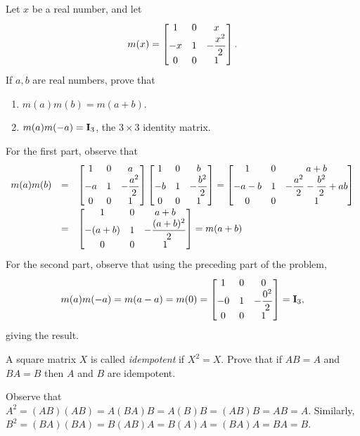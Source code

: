 \begin{exa}
Let $x$ be a real number, and let  $$m(x) = \begin{bmatrix}1 & 0 &
x\cr -x & 1 & -\dfrac{x^2}{2} \cr 0 &0 &1\cr \end{bmatrix}.  $$If
$a, b$ are real numbers, prove that
\begin{enumerate}
\item $m(a)m(b)=m(a+b)$.
\item $m(a)m(-a)={\bf I}_3$, the $3\times 3$ identity matrix.
\end{enumerate}
\begin{sol}
For the first part, observe that $$\begin{array}{llll}m(a)m(b) & = &
\begin{bmatrix}1 & 0 & a\cr -a & 1 & -\dfrac{a^2}{2} \cr 0 &0 &1\cr
\end{bmatrix}\begin{bmatrix}1 & 0 & b\cr
-b & 1 & -\dfrac{b^2}{2} \cr 0 &0 &1\cr \end{bmatrix} 
 = \begin{bmatrix}1 & 0 & a+b\cr -a-b & 1 &
-\dfrac{a^2}{2}-\dfrac{b^2}{2}+ab \cr 0 &0
&1\cr \end{bmatrix}\\
 &=&  \begin{bmatrix}1 & 0 & a+b\cr -(a+b) & 1 & -\dfrac{(a+b)^2}{2}
\cr 0 &0
&1\cr \end{bmatrix}
=  m(a+b)\end{array}$$ 
For the second part, observe that using
the preceding part of the problem, $$m(a)m(-a)= m(a-a) = m(0)
=\begin{bmatrix}1 & 0 & 0\cr -0 & 1 & -\dfrac{0^2}{2} \cr 0 &0 &1\cr
\end{bmatrix} ={\bf I}_3,$$
giving the result.
\end{sol}
\end{exa}

\begin{exer}
A square matrix $X$ is called {\em idempotent} if $X^2=X$. Prove
that if $AB=A$ and $BA=B$ then $A$ and $B$ are idempotent. 
\vspace*{1.5in}
\begin{answer}
Observe that
$A^2 = (AB)(AB) = A(BA)B = A(B)B = (AB)B = AB =A. $
Similarly,
$B^2 = (BA)(BA) = B(AB)A = B(A)A = (BA)A = BA =B. $
\end{answer}
\end{exer}


